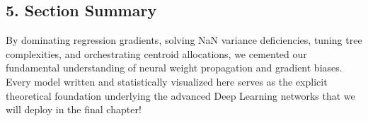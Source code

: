 \hypertarget{section-summary}{%
\subsection{5. Section Summary}\label{section-summary}}

By dominating regression gradients, solving NaN variance deficiencies,
tuning tree complexities, and orchestrating centroid allocations, we
cemented our fundamental understanding of neural weight propagation and
gradient biases. Every model written and statistically visualized here
serves as the explicit theoretical foundation underlying the advanced
Deep Learning networks that we will deploy in the final chapter!
